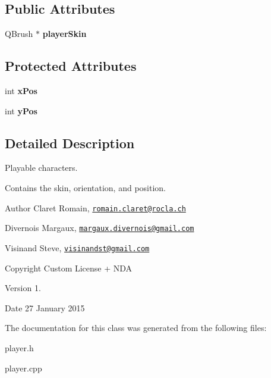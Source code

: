 \subsection*{Public Attributes}
\begin{DoxyCompactItemize}
\item 
\hypertarget{class_player_aa6bebd35f8a777820886664b9444b9b5}{}Q\+Brush $\ast$ {\bfseries player\+Skin}\label{class_player_aa6bebd35f8a777820886664b9444b9b5}

\end{DoxyCompactItemize}
\subsection*{Protected Attributes}
\begin{DoxyCompactItemize}
\item 
\hypertarget{class_player_aa3c4b095965da25dba3e777122082773}{}int {\bfseries x\+Pos}\label{class_player_aa3c4b095965da25dba3e777122082773}

\item 
\hypertarget{class_player_a0a14d018fcc4b1ad121dce82524d3c96}{}int {\bfseries y\+Pos}\label{class_player_a0a14d018fcc4b1ad121dce82524d3c96}

\end{DoxyCompactItemize}


\subsection{Detailed Description}
Playable characters. 

Contains the skin, orientation, and position. \begin{DoxyAuthor}{Author}
Claret Romain, \href{mailto:romain.claret@rocla.ch}{\tt romain.\+claret@rocla.\+ch} 

Divernois Margaux, \href{mailto:margaux.divernois@gmail.com}{\tt margaux.\+divernois@gmail.\+com} 

Visinand Steve, \href{mailto:visinandst@gmail.com}{\tt visinandst@gmail.\+com} 
\end{DoxyAuthor}
\begin{DoxyCopyright}{Copyright}
Custom License + N\+D\+A 
\end{DoxyCopyright}
\begin{DoxyVersion}{Version}
1. 
\end{DoxyVersion}
\begin{DoxyDate}{Date}
27 January 2015 
\end{DoxyDate}


The documentation for this class was generated from the following files\+:\begin{DoxyCompactItemize}
\item 
player.\+h\item 
player.\+cpp\end{DoxyCompactItemize}
